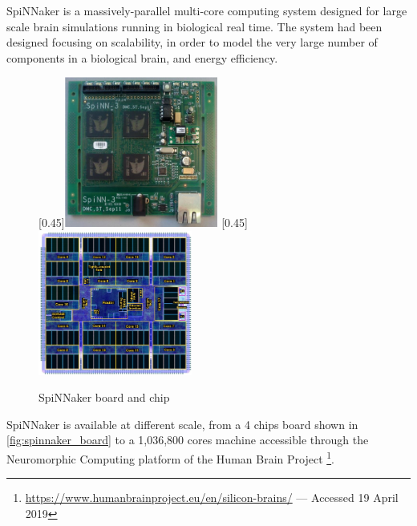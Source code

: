 SpiNNaker is a massively-parallel multi-core computing system designed for large scale brain simulations running in biological real time. The system had been designed focusing on scalability, in order to model the very large number of components in a biological brain, and energy efficiency.

\begin{figure}[ht]
\centering
{}
  [0.45\textwidth]{\includegraphics[width=0.45\textwidth]{images/context/spinnaker_board.png}}
  [0.45\textwidth]{\includegraphics[width=0.45\textwidth]{images/context/spinnaker_chip.png}}
\caption[SpiNNaker Board and Chip]{SpiNNaker board and chip}
\label{fig:spinnaker}
\end{figure}

SpiNNaker is available at different scale, from a 4 chips board shown in \cref{fig:spinnaker_board} to a 1,036,800 cores machine accessible through the Neuromorphic Computing platform of the Human Brain Project \footnote{\url{https://www.humanbrainproject.eu/en/silicon-brains/} --- Accessed 19 April 2019}.

